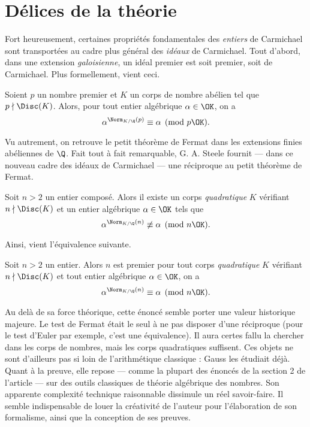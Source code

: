 \section{Délices de la théorie}

Fort heureusement, certaines propriétés fondamentales des \emph{entiers} de Carmichael sont transportées au cadre plus général des \emph{idéaux} de Carmichael. Tout d'abord, dans une extension \emph{galoisienne}, un idéal premier est soit premier, soit de Carmichael. Plus formellement, vient ceci.
\begin{theoreme}
	Soient $p$ un nombre premier et $K$ un corps de nombre abélien tel que $p\nmid \Disc(K)$. Alors, pour tout entier algébrique $\alpha \in \OK$, on a $$\alpha^{\Norm_{K/\Q}(p)} \equiv \alpha \pmod{p\OK}.$$
\end{theoreme}

Vu autrement, on retrouve le petit théorème de Fermat dans les extensions finies abéliennes de $\Q$. Fait tout à fait remarquable, G. A. Steele fournit — dans ce nouveau cadre des idéaux de Carmichael — une réciproque au petit théorème de Fermat.

\begin{theoreme}
	Soit $n>2$ un entier composé. Alors il existe un corps \emph{quadratique} $K$ vérifiant $n\nmid \Disc(K)$ et un entier algébrique $\alpha \in \OK$ tels que $$\alpha^{\Norm_{K/\Q}(n)} \not\equiv \alpha \pmod{n\OK}.$$
\end{theoreme}

Ainsi, vient l'équivalence suivante.

\begin{theoreme}
	Soit $n>2$ un entier. Alors $n$ est premier \ssi pour tout corps \emph{quadratique} $K$ vérifiant $n\nmid \Disc(K)$ et tout entier algébrique $\alpha \in \OK$, on a $$\alpha^{\Norm_{K/\Q}(n)} \equiv \alpha \pmod{n\OK}.$$
\end{theoreme}

Au delà de sa force théorique, cette énoncé semble porter une valeur historique majeure. Le test de Fermat était le seul à ne pas disposer d'une réciproque (pour le test d'Euler par exemple, c'est une équivalence). Il aura certes fallu la chercher dans les corps de nombres, mais les corps quadratiques suffisent. Ces objets ne sont d'ailleurs pas si loin de l'arithmétique classique : Gauss les étudiait déjà. Quant à la preuve, elle repose — comme la plupart des énoncés de la section 2 de l'article — sur des outils classiques de théorie algébrique des nombres. Son apparente complexité technique raisonnable dissimule un réel savoir-faire. Il semble indispensable de louer la créativité de l'auteur pour l'élaboration de son formalisme, ainsi que la conception de ses preuves. \\

